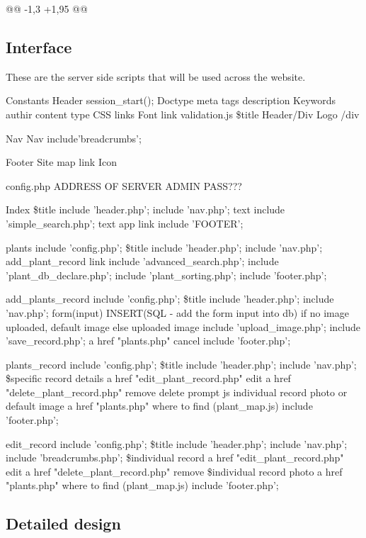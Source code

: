 @@ -1,3 +1,95 @@
\subsection{Interface}
These are the server side scripts that will be used across the website.

Constants	
Header
	session_start();
	Doctype
	meta tags
		description
		Keywords
		authir
		content type
		CSS links
		Font link
		validation.js
		\$title
	Header/Div
		Logo
	/div

Nav
	Nav
	include'breadcrumbs';
	
Footer 
	Site map link 
	Icon
	
	
config.php
	ADDRESS OF SERVER
	ADMIN PASS???
	
Index
	\$title
	include 'header.php';
	include 'nav.php';
	text
	include 'simple_search.php';
	text
		app link
	include 'FOOTER';
	
plants
	include 'config.php';
	\$title
	include 'header.php';
	include 'nav.php';
	add_plant_record link
	include 'advanced_search.php';
	include 'plant_db_declare.php';
	include 'plant_sorting.php';
	include 'footer.php';

add_plants_record
	include 'config.php';
	\$title
	include 'header.php';
	include 'nav.php';
	form(input)  INSERT(SQL - add the form input into db)
	if no image uploaded, default image else uploaded image
	include 'upload_image.php';
	include 'save_record.php';
	a href "plants.php" cancel
	include 'footer.php';

plants_record
	include 'config.php';
	\$title
	include 'header.php';
	include 'nav.php';
	\$specific record details
	a href "edit_plant_record.php" edit
	a href "delete_plant_record.php" remove
		delete prompt js
	individual record photo or default image
	a href "plants.php" where to find
		(plant_map.js)
	include 'footer.php';
	
	
	
	
edit_record
	include 'config.php';
	\$title
	include 'header.php';
	include 'nav.php';
	include 'breadcrumbs.php';
	\$individual record
	a href "edit_plant_record.php" edit
	a href "delete_plant_record.php" remove
	\$individual record photo
	a href "plants.php" where to find
		(plant_map.js)
	include 'footer.php';
	
\subsection{Detailed design}

